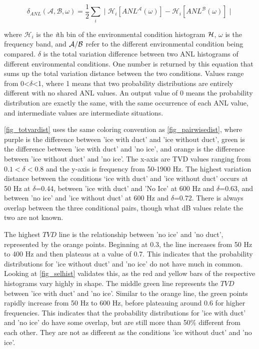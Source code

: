 
\begin{equation} \label{tdv_eq}
    \delta_{ANL} ( \mathcal{A}, \mathcal{B}, \omega) = \frac{1}{2} \sum _{i} ^{} \mid \mathcal{H}_{i} [ANL^{\mathcal{A}}(\omega)] -\mathcal{H}_{i} [ANL^{\mathcal{B}}(\omega)] \mid 
\end{equation}

where  $\mathcal{H}_{i}$ is the \textit{i}th bin of the environmental condition histogram $\cal{H}$, $\omega$ is the frequency band, and $\cal{A/B}$ refer to the different environmental condition being compared. $\delta$ is the total variation difference between two ANL histograms of different environmental conditions. One number is returned by this equation that sums up the total variation distance between the two conditions. Values range from 0<$\delta$<1, where 1 means that two probability distributions are entirely different with no shared ANL values. An output value of 0 means the probability distribution are exactly the same, with the same occurrence of each ANL value, and intermediate values are intermediate situations.

\autoref{fig_totvardist} uses the same coloring convention as \autoref{fig_pairwisedist}, where purple is the difference between 'ice with duct' and 'ice without duct', green is the difference between 'ice with duct' and 'no ice', and orange is the difference between 'ice without duct' and 'no ice'. The x-axis are TVD values ranging from $0.1<\delta<0.8$ and the y-axis is frequency from 50-1900 Hz. The highest variation distance between the conditions ‘ice with duct' and 'ice without duct’ occurs at 50 Hz at $\delta$=0.44, between 'ice with duct' and 'No Ice' at 600 Hz and $\delta$=0.63, and between 'no ice' and 'ice without duct' at 600 Hz and $\delta$=0.72. There is always overlap between the three conditional pairs, though what dB values relate the two are not known. 

The highest $TVD$ line is the relationship between 'no ice' and 'no duct', represented by the orange points. Beginning at 0.3, the line increases from 50 Hz to 400 Hz and then plateaus at a value of 0.7. This indicates that the probability distributions for 'ice without duct' and 'no ice' do not have much in common. Looking at \autoref{fig_selhist} validates this, as the red and yellow bars of the respective histograms vary highly in shape. The middle green line represents the $TVD$ between 'ice with duct' and 'no ice'. Similar to the orange line, the green points rapidly increase from 50 Hz to 600 Hz, before plateauing around 0.6 for higher frequencies. This indicates that the probability distributions for 'ice with duct' and 'no ice' do have some overlap, but are still more than 50\% different from each other. They are not as different as the conditions 'ice without duct' and 'no ice'. 


